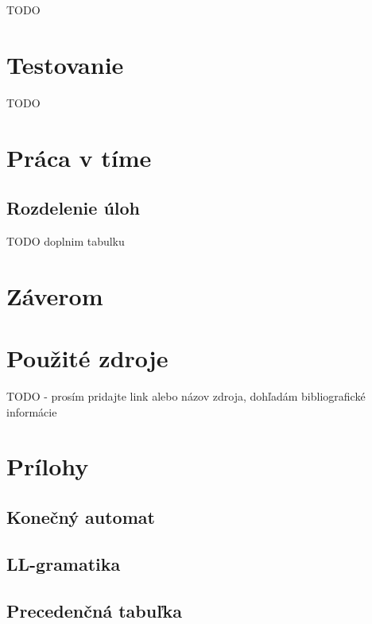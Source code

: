 \documentclass[11pt,a4paper]{article}
\begin{document}
    TODO
    
\section{Testovanie} 
\label{testovanie}

TODO

\section{Práca v tíme} 
\label{tim}

    \subsection{Rozdelenie úloh}
    
    TODO doplnim tabulku

\section{Záverom} 
\label{zaver}

\section{Použité zdroje}

TODO - prosím pridajte link alebo názov zdroja, dohľadám bibliografické informácie

\section{Prílohy}


\subsection{Konečný automat}

\subsection{LL-gramatika}

\subsection{Precedenčná tabuľka}
\end{document}
